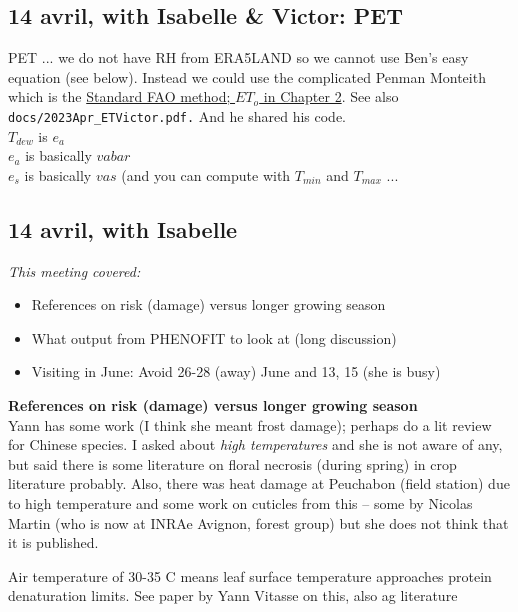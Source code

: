 \documentclass[11pt,letter]{article}
\begin{document}
\subsection{14 avril, with Isabelle \& Victor: PET}

PET ... we do not have RH from ERA5LAND so we cannot use Ben's easy equation (see below). Instead we could use the complicated Penman Monteith which is the \href{https://www.fao.org/3/x0490e/x0490e06.htm#TopOfPage}{Standard FAO method; $ET_o$ in Chapter 2}. See also \verb|docs/2023Apr_ETVictor.pdf.| And he shared his code.\\

$T_{dew}$ is $e_a$\\
$e_a$ is basically $vabar$\\
$e_s$ is basically $vas$ (and you can compute with $T_{min}$ and $T_{max}$ ...\\

\subsection{14 avril, with Isabelle}

\emph{This meeting covered:}
\begin{itemize}
\item References on risk (damage) versus longer growing season
\item What output from PHENOFIT to look at (long discussion)
\item Visiting in June: Avoid 26-28 (away) June and 13, 15 (she is busy)
\end{itemize}

{\bf References on risk (damage) versus longer growing season}\\

Yann has some work (I think she meant frost damage); perhaps do a lit review for Chinese species. I asked about \emph{high temperatures} and she is not aware of any, but said there is some literature on floral necrosis (during spring) in crop literature probably. Also, there was heat damage at Peuchabon (field station) due to high temperature and some work on cuticles from this -- some by Nicolas Martin (who is now at INRAe Avignon, forest group) but she does not think that it is published. %

Air temperature of 30-35 C means leaf surface temperature approaches protein denaturation limits. See paper by Yann Vitasse on this, also ag literature
\end{document}
